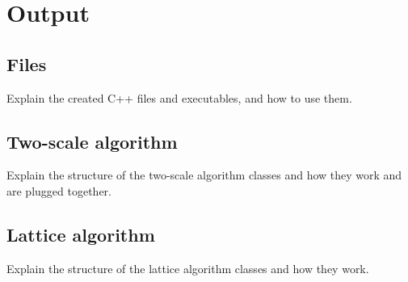 \section{Output}
\subsection{Files}

Explain the created C++ files and executables, and how to use them.

\subsection{Two-scale algorithm}

Explain the structure of the two-scale algorithm classes and how they
work and are plugged together.

\subsection{Lattice algorithm}

Explain the structure of the lattice algorithm classes and how they
work.

